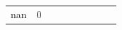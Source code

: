 \begin{table}[H]
{\begin{tabular}{lllrlllll}
\midrule
nan & 0%
\cline{1-9}

\end{tabular}}
\end{table}
